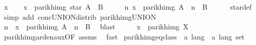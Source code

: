 \begin{isabellebody}
\ x\isanewline
\ \ \isamarkupfalse%
\ {\isachardoublequoteopen}x\ {\isasymin}\ parikh{\isacharunderscore}{\kern0pt}img\ {\isacharparenleft}{\kern0pt}star\ A\ {\isacharat}{\kern0pt}{\isacharat}{\kern0pt}\ B{\isacharparenright}{\kern0pt}{\isachardoublequoteclose}\isanewline
\ \ \isamarkupfalse%
\ \isamarkupfalse%
\ {\isachardoublequoteopen}{\isasymexists}n{\isachardot}{\kern0pt}\ x\ {\isasymin}\ parikh{\isacharunderscore}{\kern0pt}img\ {\isacharparenleft}{\kern0pt}A\ {\isacharcircum}{\kern0pt}{\isacharcircum}{\kern0pt}\ n\ {\isacharat}{\kern0pt}{\isacharat}{\kern0pt}\ B{\isacharparenright}{\kern0pt}{\isachardoublequoteclose}\isanewline
\ \ \ \ \isamarkupfalse%
\ star{\isacharunderscore}{\kern0pt}def\ \isamarkupfalse%
\ {\isacharparenleft}{\kern0pt}simp\ add{\isacharcolon}{\kern0pt}\ conc{\isacharunderscore}{\kern0pt}UNION{\isacharunderscore}{\kern0pt}distrib{\isacharparenleft}{\kern0pt}{}{\isacharparenright}{\kern0pt}\ parikh{\isacharunderscore}{\kern0pt}img{\isacharunderscore}{\kern0pt}UNION{\isacharparenright}{\kern0pt}\isanewline
\ \ \isamarkupfalse%
\ \isamarkupfalse%
\ n\ \ {\isachardoublequoteopen}x\ {\isasymin}\ parikh{\isacharunderscore}{\kern0pt}img\ {\isacharparenleft}{\kern0pt}A\ {\isacharcircum}{\kern0pt}{\isacharcircum}{\kern0pt}\ n\ {\isacharat}{\kern0pt}{\isacharat}{\kern0pt}\ B{\isacharparenright}{\kern0pt}{\isachardoublequoteclose}\ \isamarkupfalse%
\ blast\isanewline
\ \ \isamarkupfalse%
\ \isamarkupfalse%
\ {\isachardoublequoteopen}x\ {\isasymin}\ parikh{\isacharunderscore}{\kern0pt}img\ X{\isachardoublequoteclose}\ \isamarkupfalse%
\ parikh{\isacharunderscore}{\kern0pt}img{\isacharunderscore}{\kern0pt}arden{\isacharunderscore}{\kern0pt}aux{\isacharbrackleft}{\kern0pt}OF\ assms{\isacharbrackright}{\kern0pt}\ \isamarkupfalse%
\ fast\isanewline
{}\isamarkupfalse%
%
\endisatagproof
{\isafoldproof}%
%
\isadelimproof
%
\endisadelimproof
%
\isadelimdocument
%
\endisadelimdocument
%
\isatagdocument
%
\isamarkuptrue%
%
\endisatagdocument
{\isafolddocument}%
%
\isadelimdocument
%
\endisadelimdocument
{}\isamarkupfalse%
\ parikh{\isacharunderscore}{\kern0pt}img{\isacharunderscore}{\kern0pt}eq{\isacharunderscore}{\kern0pt}class\ {\isacharcolon}{\kern0pt}{\isacharcolon}{\kern0pt}\ {\isachardoublequoteopen}{\isacharprime}{\kern0pt}a\ lang\ {\isasymRightarrow}\ {\isacharprime}{\kern0pt}a\ lang\ set{\isachardoublequoteclose}\ \isanewline

\end{isabellebody}

